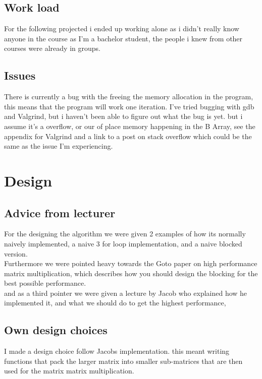 \documentclass[a4paper,10pt,titlepage]{report}
\begin{document}
\subsection{Work load}
For the following projected i ended up working alone as i didn't really know anyone in the course as I'm a bachelor student, the people i knew from other courses were already in groups. 

\subsection{Issues}
There is currently a bug with the freeing the memory allocation in the program, this means that the program will work one iteration. I've tried bugging with gdb and Valgrind, but i haven't been able to figure out what the bug is yet. but i assume it's a overflow, or our of place memory happening in the B Array, see the appendix for Valgrind and a link to a post on stack overflow which could be the same as the issue I'm experiencing. 


\section{Design}
\subsection{Advice from lecturer}
For the designing the algorithm we were given 2 examples of how its normally naively implemented, a naive 3 for loop implementation, and a naive blocked version. \\ \vspace{5mm}
Furthermore we were pointed heavy towards the Goto paper on high performance matrix multiplication, which describes how you should design the blocking for the best possible performance. \\ \vspace{5mm}
and as a third pointer we were given a lecture by Jacob who explained how he implemented it, and what we should do to get the highest performance,
\subsection{Own design choices}

I made a design choice follow Jacobs implementation. this meant writing functions that pack the larger matrix into smaller sub-matrices that are then used for the matrix matrix multiplication. \\
\end{document}
